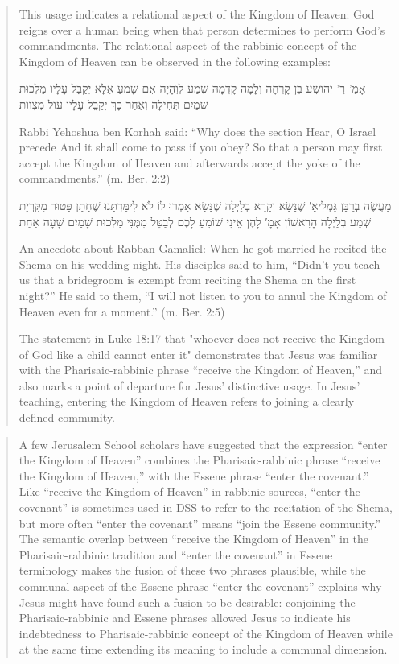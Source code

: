 \documentclass[11pt]{article}
\begin{document}
\begin{quote}
 This usage indicates a relational aspect of the Kingdom of Heaven: God reigns over a human being when that person determines to perform God’s commandments. The relational aspect of the rabbinic concept of the Kingdom of Heaven can be observed in the following examples: 
 
\begin{hebrew}
אָמַ' רֶ' יְהוֹשֻׁע בֶּן קָרְחָה וְלָמָּה קָדְמָהּ שְׁמַע לִוְהָיָה אִם שָׁמֹעַ אֶלָּא יְקַבֵּל עָלָיו מַלְכוּת שׁמַיִם תְּחִילָּה וְאַחַר כָּךְ יְקַבֵּל עָלָיו עוֹל מִצְווֹת
\end{hebrew}

Rabbi Yehoshua ben Korhah said: “Why does the section Hear, O Israel precede And it shall come to pass if you obey? So that a person may first accept the Kingdom of Heaven and afterwards accept the yoke of the commandments.” (m. Ber. 2:2)

\begin{hebrew}
מַעֲשֶׂה בְרַבָּן גַּמְלִיאֵ′ שֶׁנָּשָׂא וְקָרָא בְלַיְלָה שֶׁנָּשָׂא אָמְרוּ לוֹ לֹא לִימַּדְתָּנוּ שֶׁחָתָן פָּטוּר מִקִּרְיַת שְׁמַע בְּלַיְלָה הָרִאשׁוֹן אָמָ′ לָהֶן אֵינִי שׁוֹמֵעַ לָכֶם לְבַטֵּל מִמֶּנִּי מַלְכוּת שָׁמַיִם שָׁעָה אַחַת
\end{hebrew}

An anecdote about Rabban Gamaliel: When he got married he recited the Shema on his wedding night. His disciples said to him, “Didn’t you teach us that a bridegroom is exempt from reciting the Shema on the first night?” He said to them, “I will not listen to you to annul the Kingdom of Heaven even for a moment.” (m. Ber. 2:5)

The statement in Luke 18:17 that "whoever does not receive the Kingdom of God like a child cannot enter it" demonstrates that Jesus was familiar with the Pharisaic-rabbinic phrase “receive the Kingdom of Heaven,” and also marks a point of departure for Jesus’ distinctive usage. In Jesus’ teaching, entering the Kingdom of Heaven refers to joining a clearly defined community. \cite{kingdom of heaven jp}
\end{quote}
\begin{quote}
A few Jerusalem School scholars have suggested that the expression “enter the Kingdom of Heaven” combines the Pharisaic-rabbinic phrase “receive the Kingdom of Heaven,” with the Essene phrase “enter the covenant.” Like “receive the Kingdom of Heaven” in rabbinic sources, “enter the covenant” is sometimes used in DSS to refer to the recitation of the Shema, but more often “enter the covenant” means “join the Essene community.” The semantic overlap between “receive the Kingdom of Heaven” in the Pharisaic-rabbinic tradition and “enter the covenant” in Essene terminology makes the fusion of these two phrases plausible, while the communal aspect of the Essene phrase “enter the covenant” explains why Jesus might have found such a fusion to be desirable: conjoining the Pharisaic-rabbinic and Essene phrases allowed Jesus to indicate his indebtedness to Pharisaic-rabbinic concept of the Kingdom of Heaven while at the same time extending its meaning to include a communal dimension. \cite{kingdom of heaven jp}
\end{quote} 
\end{document}
